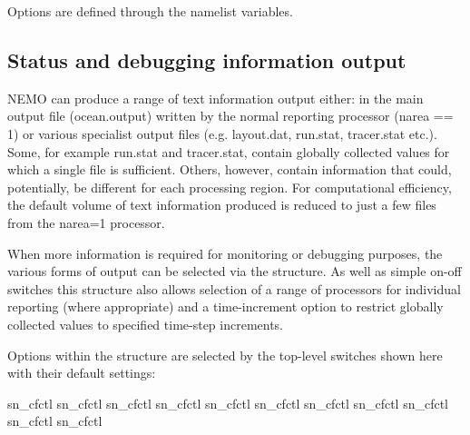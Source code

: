\documentclass[../main/NEMO_manual]{subfiles}
\begin{document}
\begin{listing}
  \caption{}
  \label{lst:namctl}
\end{listing}

Options are defined through the   namelist variables.

\subsection{Status and debugging information output}


NEMO can produce a range of text information output either: in the main output
file (ocean.output) written by the normal reporting processor (narea == 1) or various
specialist output files (e.g. layout.dat, run.stat, tracer.stat etc.). Some, for example
run.stat and tracer.stat, contain globally collected values for which a single file is
sufficient. Others, however, contain information that could, potentially, be different
for each processing region. For computational efficiency, the default volume of text
information produced is reduced to just a few files from the narea=1 processor.

When more information is required for monitoring or debugging purposes, the various
forms of output can be selected via the  structure. As well as simple
on-off switches this structure also allows selection of a range of processors for
individual reporting (where appropriate) and a time-increment option to restrict
globally collected values to specified time-step increments.

Options within the structure are selected by the top-level switches shown here
with their default settings:

\begin{forlines}
   sn_cfctl%
   sn_cfctl%
   sn_cfctl%
   sn_cfctl%
   sn_cfctl%
   sn_cfctl%
   sn_cfctl%
   sn_cfctl%
   sn_cfctl%
   sn_cfctl%
   sn_cfctl%
\end{forlines}
\end{document}
